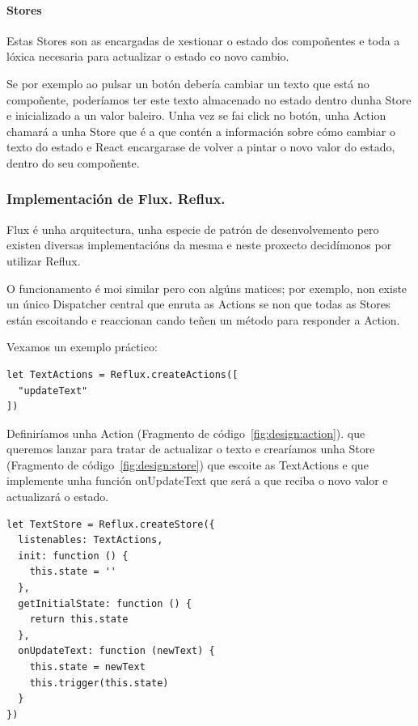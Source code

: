         \paragraph{Stores}
        Estas Stores son as encargadas de xestionar o estado dos compoñentes e 
toda a lóxica necesaria para actualizar o estado co novo cambio.

        Se por exemplo ao pulsar un botón debería cambiar un texto que está no 
compoñente, poderíamos ter este texto almacenado no estado dentro dunha Store e 
inicializado a un valor baleiro.
        Unha vez se fai click no botón, unha Action chamará a unha Store que é 
a que contén a información sobre cómo cambiar o texto do estado e React 
encargarase de volver a pintar o novo valor do estado, dentro do seu compoñente.

      \subsubsection{Implementación de Flux. Reflux.}
      Flux é unha arquitectura, unha especie de patrón de desenvolvemento pero 
existen diversas implementacións da mesma e neste proxecto decidímonos por 
utilizar Reflux\cite{web:reflux}.

      O funcionamento é moi similar pero con algúns matices; por exemplo,
non existe un único Dispatcher central que enruta as Actions se non que todas as 
Stores están escoitando e reaccionan cando teñen un método para responder a 
Action.

     Vexamos un exemplo práctico:

    \lstset{}
     \begin{lstlisting}[caption=Exemplo de Action., label=fig:design:action]
let TextActions = Reflux.createActions([
  "updateText"
])
    \end{lstlisting}

    Definiríamos unha Action (Fragmento de código~\ref{fig:design:action}). que 
queremos lanzar para tratar de actualizar o texto e crearíamos unha Store 
(Fragmento de código~\ref{fig:design:store}) que escoite as TextActions e que 
implemente unha función onUpdateText que será a que reciba o novo valor e 
actualizará o estado.

    \lstset{}
     \begin{lstlisting}[caption=Exemplo de Store., label=fig:design:store]
let TextStore = Reflux.createStore({
  listenables: TextActions,
  init: function () {
    this.state = ''
  },
  getInitialState: function () {
    return this.state
  },
  onUpdateText: function (newText) {
    this.state = newText
    this.trigger(this.state)
  }
})
    \end{lstlisting}

